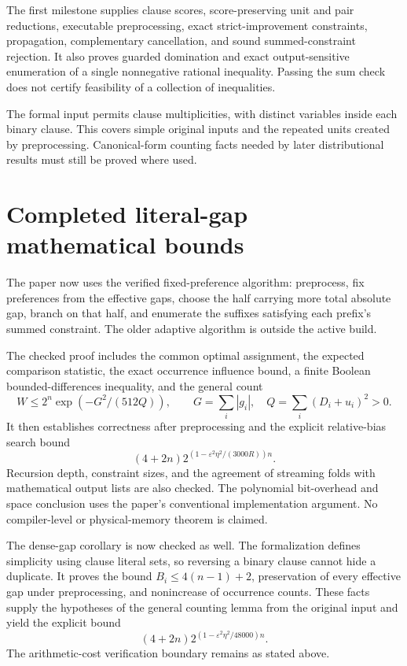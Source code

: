 \documentclass[11pt,a4paper]{article}
\begin{document}
The first milestone supplies clause scores, score-preserving unit and pair
reductions, executable preprocessing, exact strict-improvement constraints,
propagation, complementary cancellation, and sound summed-constraint
rejection. It also proves guarded domination and exact output-sensitive
enumeration of a single nonnegative rational inequality. Passing the sum
check does not certify feasibility of a collection of inequalities.

The formal input permits clause multiplicities, with distinct variables
inside each binary clause. This covers simple original inputs and the
repeated units created by preprocessing. Canonical-form counting facts
needed by later distributional results must still be proved where used.

\section{Completed literal-gap mathematical bounds}

The paper now uses the verified fixed-preference algorithm: preprocess,
fix preferences from the effective gaps, choose the half carrying more
total absolute gap, branch on that half, and enumerate the suffixes
satisfying each prefix's summed constraint. The older adaptive algorithm
is outside the active build.

The checked proof includes the common optimal assignment, the expected
comparison statistic, the exact occurrence influence bound, a finite
Boolean bounded-differences inequality, and the general count
\[
 W\le2^n\exp(-G^2/(512Q)),\qquad
 G=\sum_i|g_i|,\quad Q=\sum_i(D_i+u_i)^2>0.
\]
It then establishes correctness after preprocessing and the explicit
relative-bias search bound
\[
 (4+2n)2^{(1-\varepsilon^2\eta^2/(3000R))n}.
\]
Recursion depth, constraint sizes, and the agreement of streaming folds
with mathematical output lists are also checked. The polynomial
bit-overhead and space conclusion uses the paper's conventional
implementation argument. No compiler-level or physical-memory theorem
is claimed.

The dense-gap corollary is now checked as well. The formalization defines
simplicity using clause literal sets, so reversing a binary clause cannot
hide a duplicate. It proves the bound $B_i\le4(n-1)+2$, preservation of
every effective gap under preprocessing, and nonincrease of occurrence
counts. These facts supply the hypotheses of the general counting lemma
from the original input and yield the explicit bound
\[
 (4+2n)2^{(1-\varepsilon^2\eta^2/48000)n}.
\]
The arithmetic-cost verification boundary remains as stated above.
\end{document}
